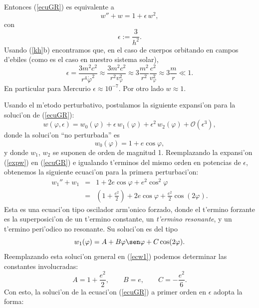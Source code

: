 Entonces (\ref{ecuGR})  es equivalente a
\begin{equation}
w''+w=1+\epsilon\,w^2 ,\label{ecwGR}
\end{equation}
con
\begin{equation}
 \epsilon:=\frac{3}{h^2}.
\end{equation}
Usando (\ref{kh}b) encontramos que, en el caso de cuerpos orbitando en campos
d'ebiles (como es el caso en nuestro sistema solar),
\begin{equation}
 \epsilon=\frac{3m^2c^2}{r^4\dot\varphi^2}\approx\frac{3m^2c^2}{r^2v_\varphi^2}
 \approx 3\frac{m^2}{r^2}\frac{c^2}{v_\varphi^2}\approx 3\frac{m}{r}\ll 1.
\end{equation}
En particular para Mercurio $\epsilon\approx 10^{-7}$. Por otro lado $w\approx
1$.

Usando el m'etodo perturbativo, postulamos la siguiente expansi'on para la soluci'on de (\ref{ecuGR}):
\begin{equation}
w(\varphi,\epsilon)=w_0(\varphi)+\epsilon\, w_1(\varphi) +\epsilon^2\,w_2(\varphi)+\mathcal{O}(\epsilon^3), \label{expw}
\end{equation}
donde la soluci'on ``no perturbada'' es
\begin{equation}
 w_0(\varphi)=1+e\cos\varphi ,
\end{equation}
y donde $w_1$, $w_2$ se suponen de orden de magnitud 1. Reemplazando la expansi'on (\ref{expw}) en (\ref{ecuGR}) e igualando t'erminos del mismo orden en potencias de $\epsilon$, obtenemos la siguiente ecuaci'on para la primera perturbaci'on:
\begin{eqnarray}
 w_1''+w_1&=&1+2e\cos\varphi+e^2\cos^2\varphi \\
&=& (1+\frac{e^2}{2})+2e\cos\varphi+\frac{e^2}{2}\cos(2\varphi). \label{ecw1}
\end{eqnarray}
Esta es una ecuaci'on tipo oscilador arm'onico forzado, donde el t'ermino forzante es la superposici'on de un t'ermino constante, un \textit{t'ermino resonante}, y un t'ermino peri'odico no resonante. Su soluci'on es del tipo
\begin{equation}
 w_1(\varphi)=A+B\varphi\sen\varphi+C\cos(2\varphi).
\end{equation}
Reemplazando esta soluci'on general en (\ref{ecw1}) podemos determinar las constantes involucradas:
\begin{equation}
 A=1+\frac{e^2}{2}, \qquad B=e, \qquad C=-\frac{e^2}{6}.
\end{equation}
Con esto, la soluci'on de la ecuaci'on (\ref{ecuGR}) a primer orden en $\epsilon$ adopta la forma:
